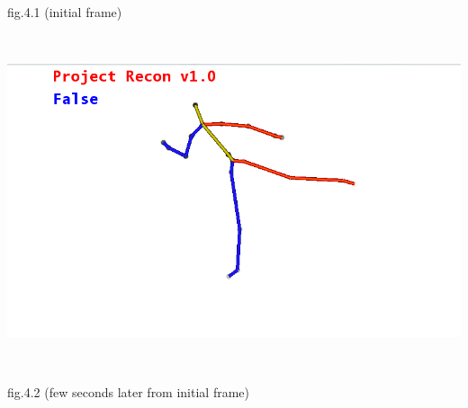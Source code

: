 \\
\centerline{fig.4.1 (initial frame)}
\\
\centerline{\includegraphics[scale=0.5]{skeleton_frame2.png}}
\\
\centerline{fig.4.2 (few seconds later from initial frame)}
\\

